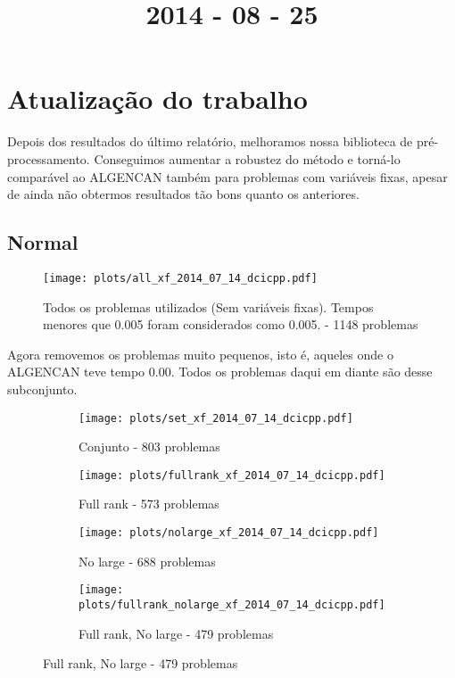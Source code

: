 \documentclass{article}
\title{2014 - 08 - 25}
\author{}
\date{}
\begin{document}
\maketitle
\section{Atualização do trabalho}

Depois dos resultados do último relatório, melhoramos nossa biblioteca de
pré-processamento. Conseguimos aumentar a robustez do método e torná-lo
comparável ao ALGENCAN também para problemas com variáveis fixas, apesar de
ainda não obtermos resultados tão bons quanto os anteriores.

\subsection{Normal}

\begin{figure}[H]
  \centering
  \texttt{[image: plots/all\_xf\_2014\_07\_14\_dcicpp.pdf]}
  \caption{Todos os problemas utilizados (Sem variáveis fixas). Tempos
    menores que 0.005 foram considerados como 0.005. - 1148 problemas}
\end{figure}
Agora removemos os problemas muito pequenos, isto é, aqueles onde o
ALGENCAN teve tempo 0.00. Todos os problemas daqui em diante são desse
subconjunto.

\begin{figure}[H]
  \centering
  \begin{subfigure}{0.48\textwidth}
    \texttt{[image: plots/set\_xf\_2014\_07\_14\_dcicpp.pdf]}
    \caption{Conjunto - 803 problemas}
  \end{subfigure}
  \begin{subfigure}{0.48\textwidth}
    \texttt{[image: plots/fullrank\_xf\_2014\_07\_14\_dcicpp.pdf]}
    \caption{Full rank - 573 problemas}
  \end{subfigure}
  \begin{subfigure}{0.48\textwidth}
    \texttt{[image: plots/nolarge\_xf\_2014\_07\_14\_dcicpp.pdf]}
    \caption{No large - 688 problemas}
  \end{subfigure}
  \begin{subfigure}{0.48\textwidth}
    \texttt{[image: plots/fullrank\_nolarge\_xf\_2014\_07\_14\_dcicpp.pdf]}
    \caption{Full rank, No large - 479 problemas}
  \end{subfigure}
\end{figure}
\end{document}
